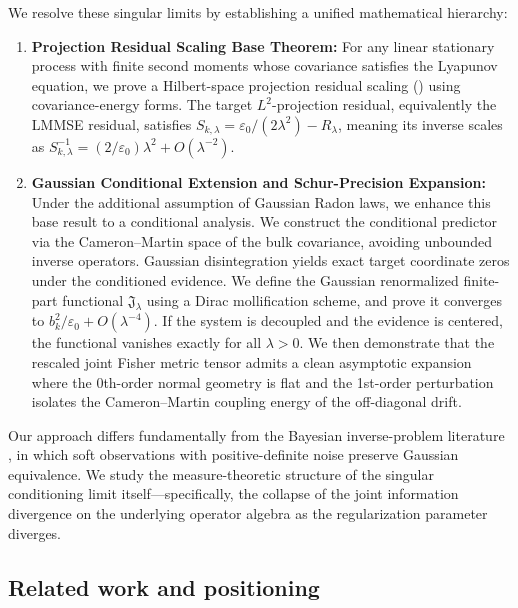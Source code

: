 \documentclass[11pt]{amsart}
\theoremstyle{plain}
\theoremstyle{definition}
\theoremstyle{remark}
\begin{document}
    We resolve these singular limits by establishing a unified mathematical hierarchy:
    \begin{enumerate}
        \item \textbf{Projection Residual Scaling Base Theorem:} For any linear stationary process with finite second moments whose covariance satisfies the Lyapunov equation, we prove a Hilbert-space projection residual scaling () using covariance-energy forms. The target $L^2$-projection residual, equivalently the LMMSE residual, satisfies $S_{k,\lambda} = \varepsilon_0/(2\lambda^2) - R_\lambda$, meaning its inverse scales as $S_{k,\lambda}^{-1} = (2/\varepsilon_0)\lambda^2 + O(\lambda^{-2})$.
        \item \textbf{Gaussian Conditional Extension and Schur-Precision Expansion:} Under the additional assumption of Gaussian Radon laws, we enhance this base result to a conditional analysis. We construct the conditional predictor via the Cameron--Martin space of the bulk covariance, avoiding unbounded inverse operators. Gaussian disintegration yields exact target coordinate zeros under the conditioned evidence. We define the Gaussian renormalized finite-part functional $\mathfrak{J}_\lambda$ using a Dirac mollification scheme, and prove it converges to $b_k^2/\varepsilon_0 + O(\lambda^{-4})$. If the system is decoupled and the evidence is centered, the functional vanishes exactly for all $\lambda > 0$. We then demonstrate that the rescaled joint Fisher metric tensor admits a clean asymptotic expansion where the 0th-order normal geometry is flat and the 1st-order perturbation isolates the Cameron--Martin coupling energy of the off-diagonal drift.
    \end{enumerate}

    Our approach differs fundamentally from the Bayesian inverse-problem literature \cite{stuart2010inverse}, in which soft observations with positive-definite noise preserve Gaussian equivalence. We study the measure-theoretic structure of the singular conditioning limit itself---specifically, the collapse of the joint information divergence on the underlying operator algebra as the regularization parameter diverges.

    \subsection{Related work and positioning}
    \label{sec:related}
\end{document}
